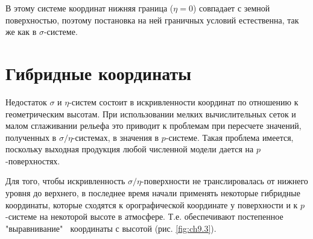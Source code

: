 В этому системе координат нижняя граница ($\eta=0$) совпадает с земной поверхностью, поэтому постановка на ней граничных условий естественна, так же как в $\sigma$-системе.

\section{{\color{done}Гибридные координаты}}
Недостаток $\sigma$ и $\eta$-систем состоит в искривленности координат по отношению к геометрическим высотам. При использовании мелких вычислительных сеток и малом сглаживании рельефа это приводит к проблемам при пересчете значений, полученных в $\sigma/\eta$-системах, в значения в $p$-системе. Такая проблема имеется, поскольку выходная продукция любой численной модели дается на $p$-поверхностях.

Для того, чтобы искривленность $\sigma/\eta$-поверхности не транслировалась от нижнего уровня до верхнего, в последнее время начали применять некоторые гибридные координаты, которые сходятся к орографической координате у поверхности и к $p$-системе на некоторой высоте в атмосфере. Т.е. обеспечивают постепенное "выравнивание" $\:$ координаты с высотой (рис. \ref{fig:ch9.3}).


